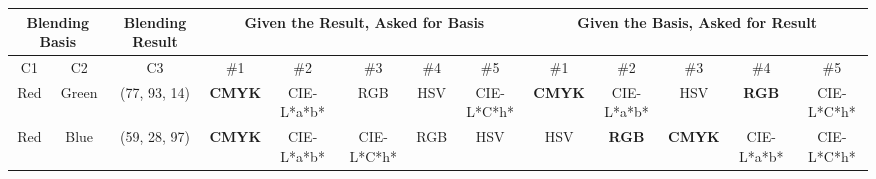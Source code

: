 \begin{table}[htbp]
  \resizebox{\textwidth}{!} {
  \begin{tabular}{@{}ccclcccccccccc@{}}
  \toprule
  \multicolumn{2}{c}{Blending Basis}                                       & \multicolumn{2}{c}{Blending Result}                        & \multicolumn{5}{c}{Given the Result, Asked for Basis}                                                                                                                                                 & \multicolumn{5}{c}{Given the Basis, Asked for Result}                                                                                                                                                                                                                   \\ \midrule
    C1                      & C2                                             & \multicolumn{2}{c|}{C3}                                    & \#1                                                        & \#2                                & \#3                             & \#4                             & \multicolumn{1}{c|}{\#5}        & \#1                                                  & \#2                                                  & \#3                                               & \#4                                               & \multicolumn{1}{c|}{\#5}                          \\ \midrule
    Red                     & \multicolumn{1}{c|}{Green}                     & \multicolumn{2}{c|}{\cellcolor[HTML]{FFFF00}(77, 93, 14)}  & \multicolumn{1}{c|}{\textbf{CMYK}}                         & \multicolumn{1}{c|}{CIE-L*a*b*}    & \multicolumn{1}{c|}{RGB}        & \multicolumn{1}{c|}{HSV}        & \multicolumn{1}{c|}{CIE-L*C*h*} & \multicolumn{1}{c|}{\textbf{CMYK}}                   & \multicolumn{1}{c|}{CIE-L*a*b*}                      & \multicolumn{1}{c|}{HSV}                          & \multicolumn{1}{c|}{\textbf{RGB}}                 & \multicolumn{1}{c|}{CIE-L*C*h*}                   \\ \midrule
    Red                     & \multicolumn{1}{c|}{Blue}                      & \multicolumn{2}{c|}{\cellcolor[HTML]{FF00FF}(59, 28, 97)}  & \multicolumn{1}{c|}{\textbf{CMYK}}                         & \multicolumn{1}{c|}{CIE-L*a*b*}    & \multicolumn{1}{c|}{CIE-L*C*h*} & \multicolumn{1}{c|}{RGB}        & \multicolumn{1}{c|}{HSV}        & \multicolumn{1}{c|}{HSV}                             & \multicolumn{1}{c|}{\textbf{RGB}}                    & \multicolumn{1}{c|}{\textbf{CMYK}}                & \multicolumn{1}{c|}{CIE-L*a*b*}                   & \multicolumn{1}{c|}{CIE-L*C*h*}                   \\ \midrule

\end{tabular}}
\end{table}
